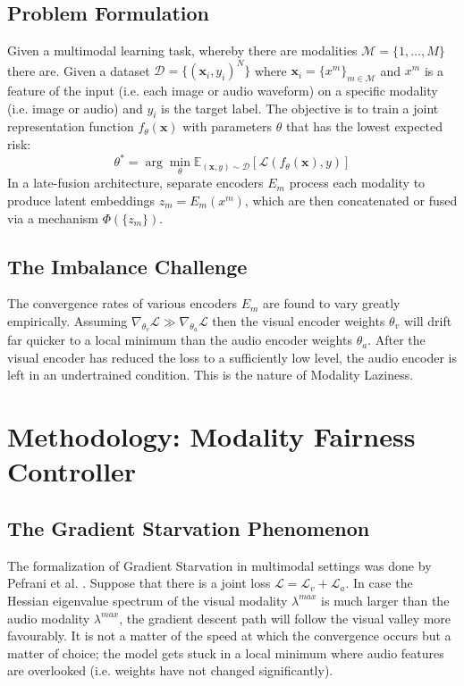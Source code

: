 \documentclass[10pt, twocolumn, letterpaper]{article}
\begin{document}
\subsection{Problem Formulation}
Given a multimodal learning task, whereby there are modalities $\mathcal{M} = \{1, \dots, M\}$ there are. Given a dataset $\mathcal{D} = \{(\mathbf{x}_i, y_i)^N\}$ where $\mathbf{x}_i = \{x^m\}_{m \in \mathcal{M}}$ and $x^m$ is a feature of the input (i.e. each image or audio waveform) on a specific modality (i.e. image or audio) and $y_i$ is the target label. The objective is to train a joint representation function $f_\theta(\mathbf{x})$ with parameters $\theta$ that has the lowest expected risk:
\begin{equation}
    \theta^* = \arg\min_\theta \mathbb{E}_{(\mathbf{x}, y) \sim \mathcal{D}} [\mathcal{L}(f_\theta(\mathbf{x}), y)]
\end{equation}
In a late-fusion architecture, separate encoders $E_m$ process each modality to produce latent embeddings $z_m = E_m(x^m)$, which are then concatenated or fused via a mechanism $\Phi(\{z_m\})$.

\subsection{The Imbalance Challenge}
The convergence rates of various encoders $E_m$ are found to vary greatly empirically. Assuming $\nabla_{\theta_v} \mathcal{L} \gg \nabla_{\theta_a} \mathcal{L}$ then the visual encoder weights $\theta_v$ will drift far quicker to a local minimum than the audio encoder weights $\theta_a$. After the visual encoder has reduced the loss to a sufficiently low level, the audio encoder is left in an undertrained condition. This is the nature of Modality Laziness.

\section{Methodology: Modality Fairness Controller}

\subsection{The Gradient Starvation Phenomenon}
The formalization of Gradient Starvation in multimodal settings was done by Pefrani et al. \cite{pezeshki2021gradient}. Suppose that there is a joint loss $\mathcal{L} = \mathcal{L}_v + \mathcal{L}_a$. In case the Hessian eigenvalue spectrum of the visual modality $\lambda^{max}$ is much larger than the audio modality $\lambda^{max}$, the gradient descent path will follow the visual valley more favourably. It is not a matter of the speed at which the convergence occurs but a matter of choice; the model gets stuck in a local minimum where audio features are overlooked (i.e. weights have not changed significantly).
\end{document}
